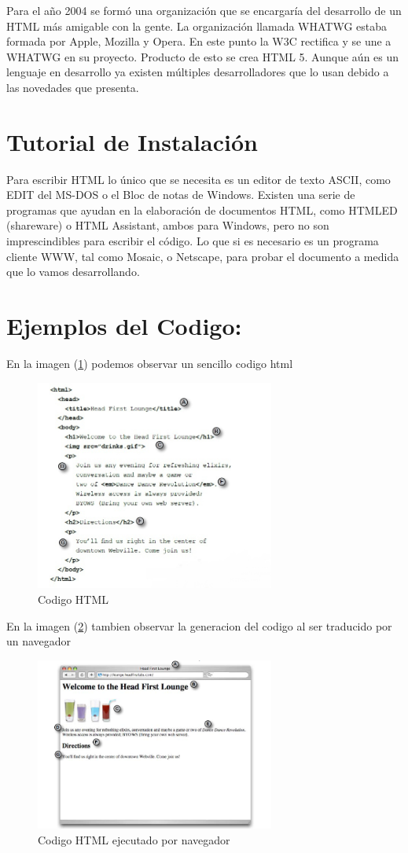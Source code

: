 \documentclass[11pt]{article} %
\begin{document}
\noindent Para el año 2004 se formó una organización que se encargaría del desarrollo de un HTML más amigable con la gente. La organización llamada WHATWG estaba formada por Apple, Mozilla y Opera. En este punto la W3C rectifica y se une a WHATWG en su proyecto. Producto de esto se crea HTML 5. Aunque aún es un lenguaje en desarrollo ya existen múltiples desarrolladores que lo usan debido a las novedades que presenta.\\
\section{Tutorial de Instalación}
Para escribir HTML lo único que se necesita es un editor de texto ASCII, como EDIT del MS-DOS o el Bloc de notas de Windows. \singlespace
\thinspace Existen una serie de programas que ayudan en la elaboración de documentos HTML, como HTMLED (shareware) o HTML Assistant, ambos para Windows, pero no son imprescindibles para escribir el código. Lo que si es necesario es un programa cliente WWW, tal como Mosaic, o Netscape, para probar el documento a medida que lo vamos desarrollando.

\section{Ejemplos del Codigo:}


En la imagen (\ref{fig:5.1})  podemos observar un sencillo codigo html 

\begin{figure}[htb]
\includegraphics[width=0.7\textwidth]{imagenes/img1.png}
\caption{Codigo HTML}
\label{fig:5.1}
\end{figure}

\singlespace
En la imagen (\ref{fig:5.2}) tambien observar la generacion del codigo al ser traducido por un navegador

\begin{figure}[htb]
\includegraphics[width=0.7\textwidth]{imagenes/img2.png}
\caption{Codigo HTML ejecutado por navegador}
\label{fig:5.2}
\end{figure}
\end{document}
